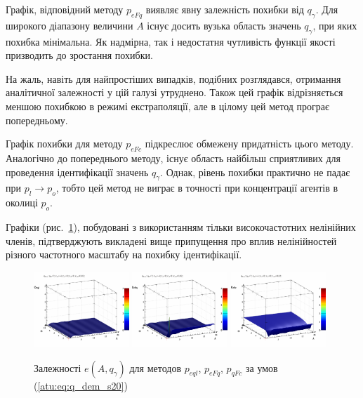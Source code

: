 Графік, відповідний методу $p_{eFq}$ виявляє явну залежність похибки від
$q_\gamma$. Для широкого діапазону величини $ A $ існує досить вузька область
значень $q_\gamma$, при яких похибка мінімальна. Як надмірна, так і
недостатня чутливість функції якості призводить до зростання похибки.

На жаль, навіть для найпростіших випадків, подібних розглядався,
отримання аналітичної залежності у цій галузі утруднено. Також
цей графік відрізняється меншою похибкою в режимі
екстраполяції, але в цілому цей метод програє попередньому.

Графік похибки для методу $p_{eFc}$ підкреслює обмежену придатність цього методу.
Аналогічно до попереднього методу, існує область найбільш
сприятливих для проведення ідентифікації значень
$ q_\gamma $. Однак, рівень похибки практично не падає при
$ p_l \to p_o $, тобто цей метод не виграє в точності при концентрації
агентів в околиці
$ p_o $.

Графіки (рис.~\ref{atu:f:qsl_pe_A_qg_s20}), побудовані з використанням тільки
високочастотних нелінійних членів, підтверджують викладені
вище припущення про вплив нелінійностей різного частотного
масштабу на похибку ідентифікації.

\begin{figure}[htb!]
  \begin{center}
    \includegraphics[width=0.32\textwidth]{p/qls_pe-p_A_qg_eql_s20.png}
    \hfill
    \includegraphics[width=0.32\textwidth]{p/qls_pe-p_A_qg_eFq_s20.png}
    \hfill
    \includegraphics[width=0.32\textwidth]{p/qls_pe-p_A_qg_eFc_s20.png}
  \end{center}
  \caption{Залежності $e(A,q_\gamma)$ для методов $p_{eql}$, $p_{eFq}$, $p_{qFc}$ за умов (\ref{atu:eq:q_dem_s20})}
  \label{atu:f:qsl_pe_A_qg_s20}
\end{figure}

